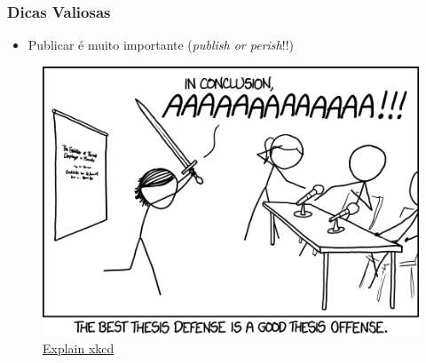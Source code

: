 \begin{frame}
    \frametitle{Dicas Valiosas}
        \begin{itemize}
            \item Publicar é muito importante (\textit{publish or perish}!!)
        \end{itemize}
        \begin{figure}
            \centering
            \includegraphics[width=0.8\linewidth]{figs/thesis_defense.png}
            \caption{\href{https://www.explainxkcd.com/wiki/index.php/1403:_Thesis_Defense}{Explain xkcd}}
        \end{figure}
\end{frame}

